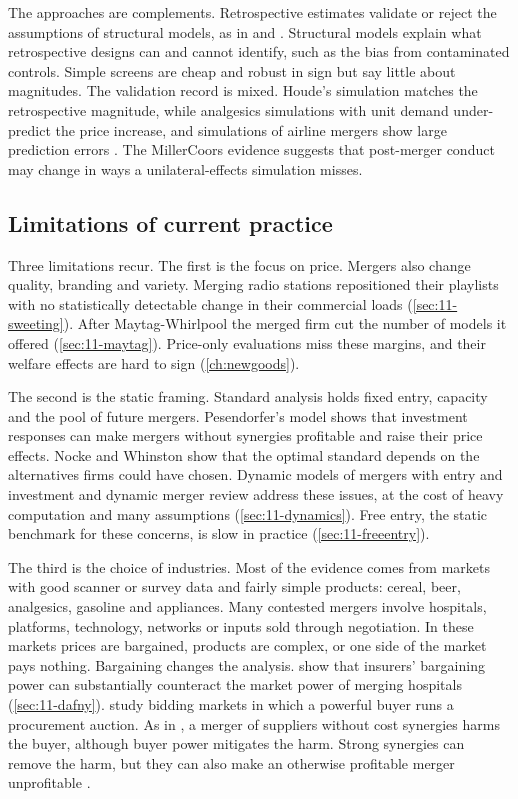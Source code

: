 The approaches are complements. Retrospective estimates validate or reject the assumptions of structural models, as in
\citet{Houde2012} and \citet{BjornerstedtVerboven2016}. Structural models explain what retrospective designs can and
cannot identify, such as the bias from contaminated controls. Simple screens are cheap and robust in sign but say little
about magnitudes. The validation record is mixed. Houde's simulation matches the retrospective magnitude, while
analgesics simulations with unit demand under-predict the price increase, and simulations of airline mergers show large
prediction errors \citep{Peters2006}.
The MillerCoors evidence suggests that post-merger conduct may change in ways a unilateral-effects simulation misses.

\subsection{Limitations of current practice}\label{sec:11-limits}

Three limitations recur. The first is the focus on price. Mergers also change quality, branding and variety. Merging
radio stations repositioned their playlists with no statistically detectable change in their commercial loads
(\cref{sec:11-sweeting}). After
Maytag-Whirlpool the merged firm cut the number of models it offered (\cref{sec:11-maytag}). Price-only evaluations miss
these margins, and their welfare effects are hard to sign (\cref{ch:newgoods}).

The second is the static framing. Standard analysis holds fixed entry, capacity and the pool of future mergers.
Pesendorfer's model shows that investment responses can make mergers without synergies profitable and raise their price
effects. Nocke and Whinston show that the optimal standard depends on the alternatives firms could have chosen. Dynamic
models of mergers with entry and investment \citep{BerryPakes1993,Gowrisankaran1999,MermelsteinEtAl2020} and dynamic
merger review \citep{NockeWhinston2010} address these issues, at the cost of heavy computation and many assumptions
(\cref{sec:11-dynamics}). Free entry, the static benchmark for these concerns, is slow in practice
(\cref{sec:11-freeentry}).

The third is the choice of industries. Most of the evidence comes from markets with good scanner or survey data and
fairly simple products: cereal, beer, analgesics, gasoline and appliances. Many contested mergers involve hospitals,
platforms, technology, networks or inputs sold through negotiation. In these markets prices are bargained, products are
complex, or one side of the market pays nothing. Bargaining changes the analysis. \citet{GowrisankaranNevoTown2015}
show that insurers' bargaining power can substantially counteract the market power of merging hospitals
(\cref{sec:11-dafny}). \citet{LoertscherMarx2019} study bidding markets in which a powerful buyer runs a procurement
auction. As in \citet{FarrellShapiro1990}, a merger of suppliers without cost synergies harms the buyer, although buyer
power mitigates the harm. Strong synergies can remove the harm, but they can also make an otherwise profitable merger
unprofitable \citep[p.~238]{AskerNocke2021}.

